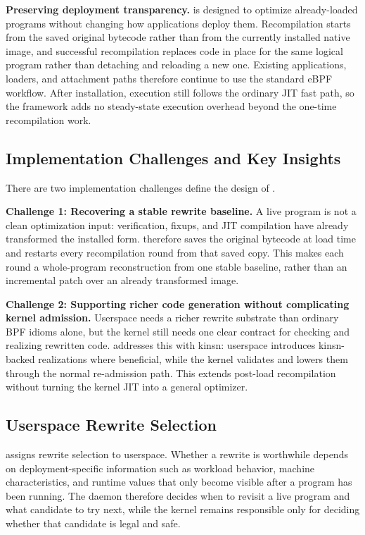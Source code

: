\noindent\textbf{Preserving deployment transparency.}
\tool is designed to optimize already-loaded programs without changing how applications deploy them. Recompilation starts from the saved original bytecode rather than from the currently installed native image, and successful recompilation replaces code in place for the same logical program rather than detaching and reloading a new one. Existing applications, loaders, and attachment paths therefore continue to use the standard eBPF workflow. After installation, execution still follows the ordinary JIT fast path, so the framework adds no steady-state execution overhead beyond the one-time recompilation work.

\subsection{Implementation Challenges and Key Insights}
\label{sec:rejit-challenges}

There are two implementation challenges define the design of \tool.

\noindent\textbf{Challenge 1: Recovering a stable rewrite baseline.}
A live program is not a clean optimization input: verification, fixups, and JIT compilation have already transformed the installed form. \tool therefore saves the original bytecode at load time and restarts every recompilation round from that saved copy. This makes each round a whole-program reconstruction from one stable baseline, rather than an incremental patch over an already transformed image.

\noindent\textbf{Challenge 2: Supporting richer code generation without complicating kernel admission.}
Userspace needs a richer rewrite substrate than ordinary BPF idioms alone, but the kernel still needs one clear contract for checking and realizing rewritten code. \tool addresses this with kinsn: userspace introduces kinsn-backed realizations where beneficial, while the kernel validates and lowers them through the normal re-admission path. This extends post-load recompilation without turning the kernel JIT into a general optimizer.

\subsection{Userspace Rewrite Selection}
\label{sec:design-daemon}

\tool assigns rewrite selection to userspace. Whether a rewrite is worthwhile depends on deployment-specific information such as workload behavior, machine characteristics, and runtime values that only become visible after a program has been running. The daemon therefore decides when to revisit a live program and what candidate to try next, while the kernel remains responsible only for deciding whether that candidate is legal and safe.

